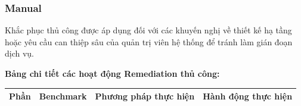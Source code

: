 \subsubsection{Manual}\label{trien-khai-remediate-manual}

Khắc phục thủ công được áp dụng đối với các khuyến nghị về thiết kế hạ tầng hoặc yêu cầu can thiệp sâu của quản trị viên hệ thống để tránh làm gián đoạn dịch vụ.

\textbf{Bảng chi tiết các hoạt động Remediation thủ công:}

{\def\LTcaptype{none}
\begin{center}
\label{tab:chi-tiet-khac-phuc-thu-cong}
\end{center}
\begin{longtable}[]{@{}|
  >{\raggedright\arraybackslash}p{}|
  >{\raggedright\arraybackslash}p{}|
  >{\raggedright\arraybackslash}p{}|
  >{\raggedright\arraybackslash}p{}|@{}}
\hline
\begin{minipage}[b]{\linewidth}\raggedright
\textbf{Phần}
\end{minipage} & \begin{minipage}[b]{\linewidth}\raggedright
\textbf{Benchmark}
\end{minipage} & \begin{minipage}[b]{\linewidth}\raggedright
\textbf{Phương pháp thực hiện}
\end{minipage} & \begin{minipage}[b]{\linewidth}\raggedright
\textbf{Hành động thực hiện}
\end{minipage} \\
\hline
\endhead


\end{longtable}}

